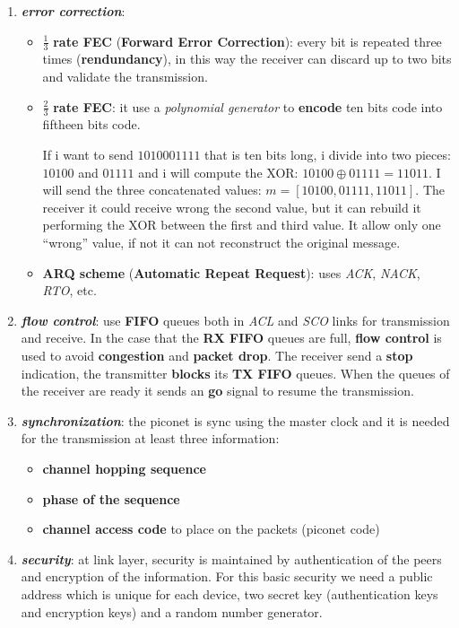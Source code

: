 \begin{enumerate}[nosep]
    \item \textbf{\textit{error correction}}:
    \begin{itemize}[nosep]
        \item $\frac{1}{3}$ \textbf{rate FEC} (\textbf{Forward Error Correction}): every bit is repeated three times (\textbf{rendundancy}), in this way the receiver can discard up to two bits and validate the transmission.
        \item $\frac{2}{3}$ \textbf{rate FEC}: it use a \textit{polynomial generator} to \textbf{encode} ten bits code into fiftheen bits code.
        \begin{boxA}
            If i want to send $1010001111$ that is ten bits long, i divide into two pieces: $10100$ and $01111$ and i will compute the XOR: $10100 \oplus 01111 = 11011$. I will send the three concatenated values: $m = [10100, 01111, 11011]$. The receiver it could receive wrong the second value, but it can rebuild it performing the XOR between the first and third value. It allow only one ``wrong'' value, if not it can not reconstruct the original message.
        \end{boxA}
        \item \textbf{ARQ scheme} (\textbf{Automatic Repeat Request}): uses \textit{ACK}, \textit{NACK}, \textit{RTO}, etc.
    \end{itemize}
    \item \textbf{\textit{flow control}}: use \textbf{FIFO} queues both in \textit{ACL} and \textit{SCO} links for transmission and receive. In the case that the \textbf{RX FIFO} queues are full, \textbf{flow control} is used to avoid \textbf{congestion} and \textbf{packet drop}. The receiver send a \textbf{stop} indication, the transmitter \textbf{blocks} its \textbf{TX FIFO} queues. When the queues of the receiver are ready it sends an \textbf{go} signal to resume the transmission.
    \item \textbf{\textit{synchronization}}: the piconet is sync using the master clock and it is needed for the transmission at least three information:
    \begin{itemize}[nosep]
        \item \textbf{channel hopping sequence}
        \item \textbf{phase of the sequence}
        \item \textbf{channel access code} to place on the packets (piconet code)
    \end{itemize}
    \item \textbf{\textit{security}}: at link layer, security is maintained by authentication of the peers and encryption of the information. For this basic security we need a public address which is unique for each device, two secret key (authentication keys and encryption keys) and a random number generator.
\end{enumerate}
